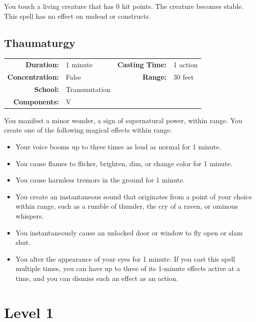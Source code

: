 \documentclass[12pt,showtrims]{memoir}
\begin{document}
\vspace{1\baselineskip}\noindent You touch a living creature that has 0 hit points. The creature becomes stable. This spell has no effect on undead or constructs.

\newpage
\section*{Thaumaturgy}

{
\small\centering\vspace{-6pt}
\begin{tabular}{rlrl}
\toprule

\textbf{Duration:} & 1 minute &
\textbf{Casting Time:} & 1 action \\
\textbf{Concentration:} & False &
\textbf{Range:} & 30 feet \\
\textbf{School:} & Transmutation \\
\textbf{Components:} & \multicolumn{3}{p{0.7\textwidth}}{V}\\

\bottomrule
\end{tabular}
}

\vspace{1\baselineskip}\noindent You manifest a minor wonder, a sign of supernatural power, within range. You create one of the following magical effects within range.
\begin{itemize}
    \item Your voice booms up to three times as loud as normal for 1 minute.
    \item You cause flames to flicker, brighten, dim, or change color for 1 minute.
    \item You cause harmless tremors in the ground for 1 minute.
    \item You create an instantaneous sound that originates from a point of your choice within range, such as a rumble of thunder, the cry of a raven, or ominous whispers.
    \item You instantaneously cause an unlocked door or window to fly open or slam shut.
    \item You alter the appearance of your eyes for 1 minute. If you cast this spell multiple times, you can have up to three of its 1-minute effects active at a time, and you can dismiss such an effect as an action.
\end{itemize}


\newpage
\chapter*{Level 1} 
\end{document}
